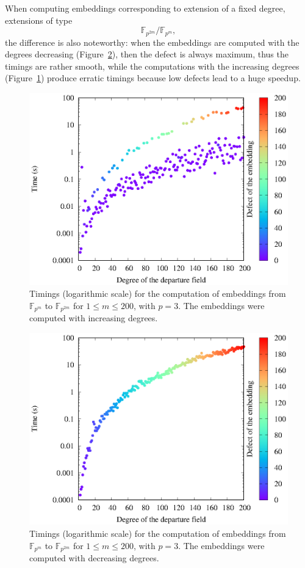 When computing embeddings corresponding to extension of a fixed degree, \eg
extensions of type
\[
  \mathbb{F}_{p^{2m}}/\mathbb{F}_{p^{m}},
\]
the difference is also noteworthy: when the embeddings are computed with the
degrees decreasing (Figure~\ref{fig:bcs-embed-fixed-degree-down}), then the defect is
always maximum, thus the timings are rather smooth, while the computations with
the increasing degrees (Figure~\ref{fig:bcs-embed-fixed-degree-up}) produce
erratic timings because low defects lead to a huge speedup.
\begin{figure}
  \centering
  \includegraphics{benchmarks/lattice-bcs/embed-fixed-degree-from-12-to-24-up.eps}
  \caption{Timings (logarithmic scale) for the computation of embeddings from $\mathbb{F}_{p^{m}}$
  to $\mathbb{F}_{p^{2m}}$ for $1\leq m\leq 200$, with $p=3$. The
  embeddings were computed with increasing degrees.}
  \label{fig:bcs-embed-fixed-degree-up}
\end{figure}
\begin{figure}
  \centering
  \includegraphics{benchmarks/lattice-bcs/embed-fixed-degree-from-12-to-24-down.eps}
  \caption{Timings (logarithmic scale) for the computation of embeddings from $\mathbb{F}_{p^{m}}$
  to $\mathbb{F}_{p^{2m}}$ for $1\leq m\leq 200$, with $p=3$. The
  embeddings were computed with decreasing degrees.}
  \label{fig:bcs-embed-fixed-degree-down}
\end{figure}

